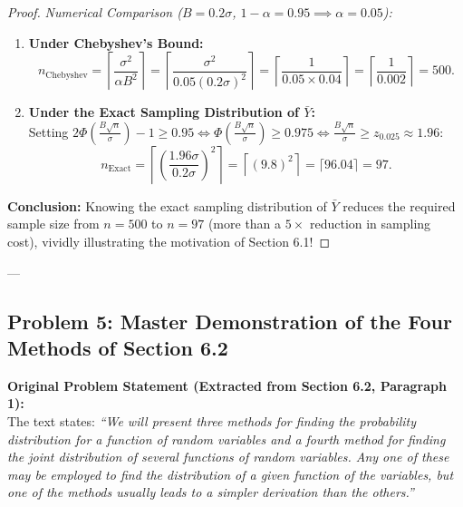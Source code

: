 \documentclass[11pt, letterpaper]{article}
\theoremstyle{definition}
\theoremstyle{remark}
\begin{document}
\begin{proof}
\emph{Numerical Comparison ($B = 0.2\sigma$, $1 - \alpha = 0.95 \implies \alpha = 0.05$):}
\begin{enumerate}[label=\arabic*.]
    \item \textbf{Under Chebyshev's Bound:}
    \[
        n_{\text{Chebyshev}} = \left\lceil \frac{\sigma^2}{\alpha B^2} \right\rceil = \left\lceil \frac{\sigma^2}{0.05 (0.2\sigma)^2} \right\rceil = \left\lceil \frac{1}{0.05 \times 0.04} \right\rceil = \left\lceil \frac{1}{0.002} \right\rceil = 500.
    \]
    \item \textbf{Under the Exact Sampling Distribution of $\bar{Y}$:} \\ \relax
    Setting $2\Phi\left(\frac{B\sqrt{n}}{\sigma}\right) - 1 \ge 0.95 \iff \Phi\left(\frac{B\sqrt{n}}{\sigma}\right) \ge 0.975 \iff \frac{B\sqrt{n}}{\sigma} \ge z_{0.025} \approx 1.96$:
    \[
        n_{\text{Exact}} = \left\lceil \left(\frac{1.96 \sigma}{0.2 \sigma}\right)^2 \right\rceil = \left\lceil (9.8)^2 \right\rceil = \lceil 96.04 \rceil = 97.
    \]
\end{enumerate}
\textbf{Conclusion:} Knowing the exact sampling distribution of $\bar{Y}$ reduces the required sample size from $n = 500$ to $n = 97$ (more than a $5\times$ reduction in sampling cost), vividly illustrating the motivation of Section 6.1!
\end{proof}

---

\subsection{Problem 5: Master Demonstration of the Four Methods of Section 6.2}

\textbf{Original Problem Statement (Extracted from Section 6.2, Paragraph 1):} \\ \relax
The text states: \emph{``We will present three methods for finding the probability distribution for a function of random variables and a fourth method for finding the joint distribution of several functions of random variables. Any one of these may be employed to find the distribution of a given function of the variables, but one of the methods usually leads to a simpler derivation than the others.''}
\end{document}
